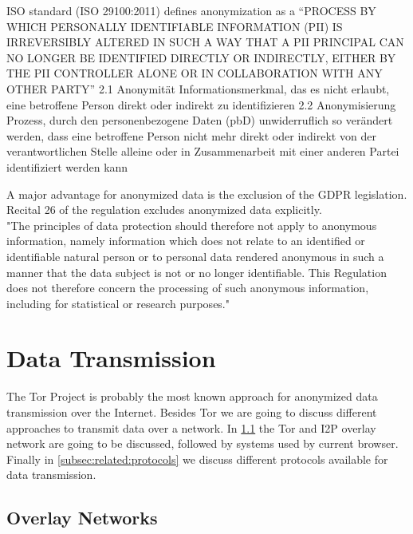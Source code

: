 ISO standard (ISO 29100:2011) defines anonymization as a 
“PROCESS BY WHICH PERSONALLY IDENTIFIABLE INFORMATION (PII) IS IRREVERSIBLY ALTERED IN SUCH A WAY THAT A PII PRINCIPAL CAN NO LONGER BE IDENTIFIED DIRECTLY OR INDIRECTLY, EITHER BY THE PII CONTROLLER ALONE OR IN COLLABORATION WITH ANY OTHER PARTY”
2.1
Anonymität
Informationsmerkmal, das es nicht erlaubt, eine betroffene Person direkt oder indirekt zu identifizieren
2.2
Anonymisierung
Prozess, durch den personenbezogene Daten (pbD) unwiderruflich so verändert werden, dass eine
betroffene Person nicht mehr direkt oder indirekt von der verantwortlichen Stelle alleine oder in
Zusammenarbeit mit einer anderen Partei identifiziert werden kann

A major advantage for anonymized data is the exclusion of the GDPR legislation. Recital 26 of the regulation excludes anonymized data explicitly.\\ 
"The principles of data protection should therefore not apply to anonymous information, namely information which does not relate to an identified or identifiable natural person or to personal data rendered anonymous in such a manner that the data subject is not or no longer identifiable. This Regulation does not therefore concern the processing of such anonymous information, including for statistical or research purposes."\cite{european_union_regulation_2016}

\section{Data Transmission}
\label{sec:related_work:data_transmission}
%
The Tor Project is probably the most known approach for anonymized data transmission over the Internet. Besides Tor we are going to discuss different approaches to transmit data over a network. In \ref{subsec:related:overlay} the Tor and I2P overlay network are going to be discussed, followed by systems used by current browser. Finally in \ref{subsec:related:protocols} we discuss different protocols available for data transmission.
%
%
%
\subsection{Overlay Networks}
\label{subsec:related:overlay}
%
